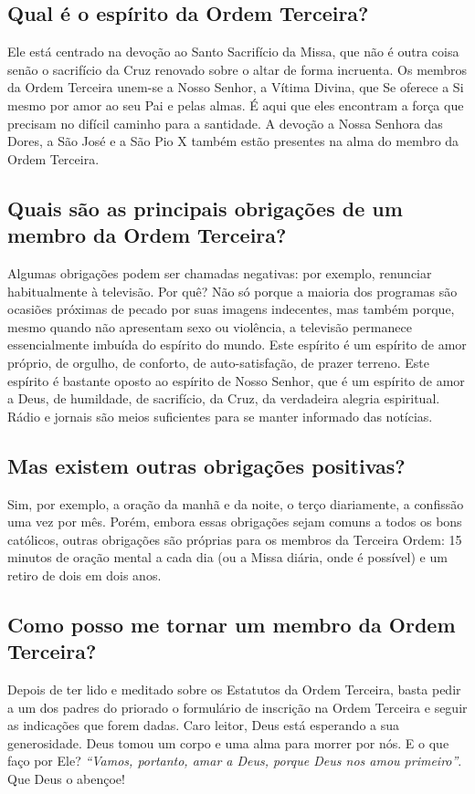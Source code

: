 \documentclass[11pt]{article}
\begin{document}
\subsection{Qual é o espírito da Ordem Terceira?}\label{subsec:qual-é-o-espírito-da-ordem-terceira?}

Ele está centrado na devoção ao Santo Sacrifício da Missa, que não é outra coisa senão o sacrifício da Cruz renovado sobre o altar de forma incruenta.
Os membros da Ordem Terceira unem-se a Nosso Senhor, a Vítima Divina, que Se oferece a Si mesmo por amor ao seu Pai e pelas almas.
É aqui que eles encontram a força que precisam no difícil caminho para a santidade.
A devoção a Nossa Senhora das Dores, a São José e a São Pio X também estão presentes na alma do membro da Ordem Terceira.

\subsection{Quais são as principais obrigações de um membro da Ordem Terceira?}\label{subsec:quais-são-as-principais-obrigações-de-um-membro-da-ordem-terceira?}

Algumas obrigações podem ser chamadas negativas: por exemplo, renunciar habitualmente à televisão.
Por quê?
Não só porque a maioria dos programas são ocasiões próximas de pecado por suas imagens indecentes, mas também porque, mesmo quando não apresentam sexo ou violência, a televisão permanece essencialmente imbuída do espírito do mundo.
Este espírito é um espírito de amor próprio, de orgulho, de conforto, de auto-satisfação, de prazer terreno.
Este espírito é bastante oposto ao espírito de Nosso Senhor, que é um espírito de amor a Deus, de humildade, de sacrifício, da Cruz, da verdadeira alegria espiritual.
Rádio e jornais são meios suficientes para se manter informado das notícias.

\subsection{Mas existem outras obrigações positivas?}\label{subsec:mas-existem-outras-obrigações-positivas?}

Sim, por exemplo, a oração da manhã e da noite, o terço diariamente, a confissão uma vez por mês.
Porém, embora essas obrigações sejam comuns a todos os bons católicos, outras obrigações são próprias para os membros da Terceira Ordem: 15 minutos de oração mental a cada dia (ou a Missa diária, onde é possível) e um retiro de dois em dois anos.

\subsection{Como posso me tornar um membro da Ordem Terceira?}\label{subsec:como-posso-me-tornar-um-membro-da-ordem-terceira?}

Depois de ter lido e meditado sobre os Estatutos da Ordem Terceira, basta pedir a um dos padres do priorado o formulário de inscrição na Ordem Terceira e seguir as indicações que forem dadas.
Caro leitor, Deus está esperando a sua generosidade.
Deus tomou um corpo e uma alma para morrer por nós.
E o que faço por Ele?
\textit{``Vamos, portanto, amar a Deus, porque Deus nos amou primeiro''}.
Que Deus o abençoe!
\end{document}
